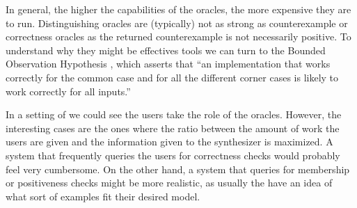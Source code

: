 
In general, the higher the capabilities of the oracles, the more expensive they
are to run. Distinguishing oracles are (typically) not as strong as
counterexample or correctness oracles as the returned counterexample is not
necessarily positive. To understand why they might be effectives tools we can
turn to the Bounded Observation Hypothesis \cite{Solar-Lezama:2008}, which
asserts that ``an implementation that works correctly for the common case and
for all the different corner cases is likely to work correctly for all inputs.''

In a setting of  we could see the
users take the role of the oracles. However, the interesting cases are the ones
where the ratio between the amount of work the users are given and the
information given to the synthesizer is maximized. A system that frequently
queries the users for correctness checks would probably feel very cumbersome. On
the other hand, a system that queries for membership or positiveness checks
might be more realistic, as usually the  have an idea of what sort of examples fit their desired
model.

